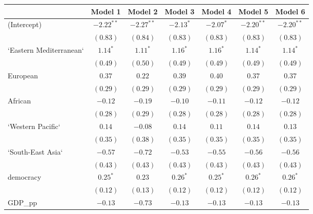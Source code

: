 
\begin{table}[!h]
\begin{center}
\begin{tabular}{l c c c c c c }
\toprule
 & Model 1 & Model 2 & Model 3 & Model 4 & Model 5 & Model 6 \\
\midrule
(Intercept)             & $-2.22^{**}$ & $-2.27^{**}$ & $-2.13^{*}$  & $-2.07^{*}$  & $-2.20^{**}$ & $-2.20^{**}$ \\
                        & $(0.83)$     & $(0.84)$     & $(0.83)$     & $(0.83)$     & $(0.83)$     & $(0.83)$     \\
`Eastern Mediterranean` & $1.14^{*}$   & $1.11^{*}$   & $1.16^{*}$   & $1.16^{*}$   & $1.14^{*}$   & $1.14^{*}$   \\
                        & $(0.49)$     & $(0.50)$     & $(0.49)$     & $(0.49)$     & $(0.49)$     & $(0.49)$     \\
European                & $0.37$       & $0.22$       & $0.39$       & $0.40$       & $0.37$       & $0.37$       \\
                        & $(0.29)$     & $(0.29)$     & $(0.29)$     & $(0.29)$     & $(0.29)$     & $(0.29)$     \\
African                 & $-0.12$      & $-0.19$      & $-0.10$      & $-0.11$      & $-0.12$      & $-0.12$      \\
                        & $(0.28)$     & $(0.29)$     & $(0.28)$     & $(0.28)$     & $(0.28)$     & $(0.28)$     \\
`Western Pacific`       & $0.14$       & $-0.08$      & $0.14$       & $0.11$       & $0.14$       & $0.13$       \\
                        & $(0.35)$     & $(0.38)$     & $(0.35)$     & $(0.35)$     & $(0.35)$     & $(0.35)$     \\
`South-East Asia`       & $-0.57$      & $-0.72$      & $-0.53$      & $-0.55$      & $-0.56$      & $-0.56$      \\
                        & $(0.43)$     & $(0.43)$     & $(0.43)$     & $(0.43)$     & $(0.43)$     & $(0.43)$     \\
democracy               & $0.25^{*}$   & $0.23$       & $0.26^{*}$   & $0.25^{*}$   & $0.26^{*}$   & $0.26^{*}$   \\
                        & $(0.12)$     & $(0.13)$     & $(0.12)$     & $(0.12)$     & $(0.12)$     & $(0.12)$     \\
GDP\_pp                 & $-0.13$      & $-0.73$      & $-0.13$      & $-0.13$      & $-0.13$      & $-0.13$      \\

\end{tabular}
\end{center}
\end{table}

